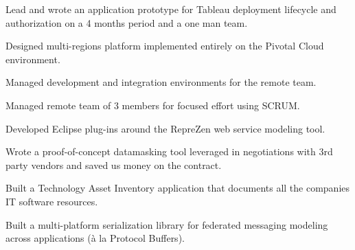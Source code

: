 \documentclass[letterpaper]{deedy-resume} %
\begin{document}
\begin{minipage}[t]{0.66\textwidth}
\sectionspace %


\begin{tightitemize}
\item Lead and wrote an application prototype for Tableau deployment lifecycle and authorization
on a 4 months period and a one man team.
\item Designed multi-regions platform implemented entirely on the Pivotal Cloud environment.
\end{tightitemize}

\sectionspace %



\begin{tightitemize}
\item Managed development and integration environments for the remote team.
\item Managed remote team of 3 members for focused effort using SCRUM.
\item Developed Eclipse plug-ins around the RepreZen web service modeling tool.
\end{tightitemize}

\sectionspace %



\begin{tightitemize}
\item Wrote a proof-of-concept datamasking tool leveraged in negotiations with 3rd party vendors and saved
us money on the contract.
\item Built a Technology Asset Inventory application that documents all the companies IT software resources. 
\item Built a multi-platform serialization library for federated messaging modeling across applications 
(à la Protocol Buffers).
\end{tightitemize}

\sectionspace %


\end{minipage}
\end{document}
